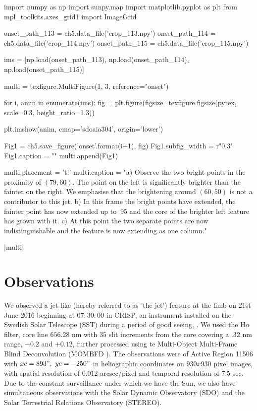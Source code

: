 \begin{pycode}[chapter5]
import numpy as np
import sunpy.map
import matplotlib.pyplot as plt
from mpl_toolkits.axes_grid1 import ImageGrid

onset_path_113 = ch5.data_file('crop_113.npy')
onset_path_114 = ch5.data_file('crop_114.npy')
onset_path_115 = ch5.data_file('crop_115.npy')

ims = [np.load(onset_path_113), np.load(onset_path_114), np.load(onset_path_115)]


multi = texfigure.MultiFigure(1, 3, reference="onset")

for i, anim in enumerate(ims):
    fig = plt.figure(figsize=texfigure.figsize(pytex, scale=0.3, height_ratio=1.3))

    plt.imshow(anim, cmap='sdoaia304', origin='lower')

    Fig1 = ch5.save_figure('onset{}'.format(i+1), fig)
    Fig1.subfig_width = r"0.3\textwidth"
    Fig1.caption = ""
    multi.append(Fig1)

multi.placement = 't!'
multi.caption = "a) Observe the two bright points in the proximity of $(79, 60)$. The point on the left is significantly brighter than the fainter on the right. We emphasise that the brightening around $(60, 50)$ is not a contributor to this jet. b) In this frame the bright points have extended, the fainter point has now extended up to $~95$ and the core of the brighter left feature has grown with it. c) At this point the two separate points are now indistinguishable and the feature is now extending as one column."
\end{pycode}

\py[chapter5]|multi|



\section{Observations}
\label{sec:obs_sect}
We observed a jet-like (hereby referred to as 'the jet') feature at the limb on $21$st June 2016 beginning at $07:30:00$ in CRISP, an instrument installed on the Swedish Solar Telescope (SST) during a period of good seeing, \cite{Scharmer2003}.
We used the H$\alpha$ filter, core line $656.28$ nm with $35$ slit increments from the core covering a $.32$ nm range, $-0.2$ and $+0.12$, further processed using te Multi-Object Multi-Frame Blind Deconvolution (MOMBFD \cite{vanNoort2005}).
The observations were of Active Region 11506 with $xc = 893",\ yc = -250"$ in heliographic coordinates on $930x930$ pixel images, with spatial resolution of $0.012$ arcsec/pixel and temporal resolution of $7.5$ sec.
Due to the constant surveillance under which we have the Sun, we also have simultaneous observations with the Solar Dynamic Observatory (SDO) and the Solar Terrestrial Relations Observatory (STEREO).

